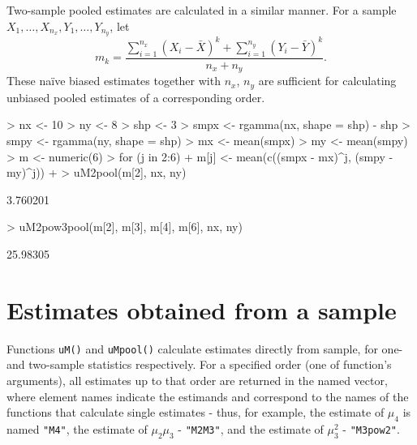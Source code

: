 \documentclass[12pt]{article}
\begin{document}
\begin{sloppypar}
Two-sample pooled estimates are calculated in a similar manner. For a sample $X_1, \dotsc, X_{n_x}, Y_1, \dotsc, Y_{n_y}$, let
\begin{equation}
m_k = \frac{\sum_{i = 1}^{n_x} (X_i - \bar{X})^k + \sum_{i = 1}^{n_y} (Y_i - \bar{Y})^k}{n_x + n_y}.
\end{equation}
These na\"ive biased estimates together with $n_x$, $n_y$ are sufficient for calculating unbiased pooled estimates of a corresponding order.
\end{sloppypar}
\begin{Schunk}
\begin{Sinput}
> nx <- 10
> ny <- 8
> shp <- 3
> smpx <- rgamma(nx, shape = shp) - shp
> smpy <- rgamma(ny, shape = shp)
> mx <- mean(smpx)
> my <- mean(smpy)
> m  <- numeric(6)
> for (j in 2:6) {
+   m[j] <- mean(c((smpx - mx)^j, (smpy - my)^j))
+ }
> uM2pool(m[2], nx, ny)
\end{Sinput}
\begin{Soutput}
[1] 3.760201
\end{Soutput}
\begin{Sinput}
> uM2pow3pool(m[2], m[3], m[4], m[6], nx, ny)
\end{Sinput}
\begin{Soutput}
[1] 25.98305
\end{Soutput}
\end{Schunk}

\section{Estimates obtained from a sample}

Functions \texttt{uM()} and \texttt{uMpool()} calculate estimates directly from sample, for one- and two-sample statistics respectively. For a specified order (one of function's  arguments), all estimates up to that order are returned in the named vector, where element names indicate the estimands and correspond to the names of the functions that calculate single estimates - thus, for example, the estimate of $\mu_4$ is named \texttt{"M4"}, the estimate of $\mu_2 \mu_3$ - \texttt{"M2M3"}, and the estimate of $\mu_3^2$ - \texttt{"M3pow2"}.
\end{document}

